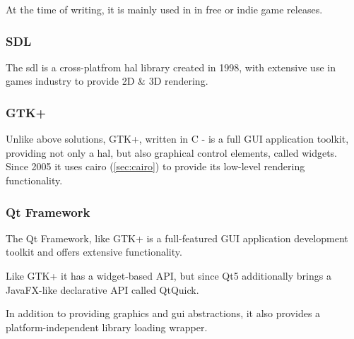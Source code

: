 At the time of writing, it is mainly used in in free or indie game releases.

\subsubsection{SDL}
The \gls{sdl} is a cross-platfrom \gls{hal} library created in 1998, with extensive use in games industry to provide 2D \& 3D rendering.

\subsubsection{GTK+}
Unlike above solutions, GTK+, written in C - is a full GUI application toolkit, providing not only a \gls{hal}, but also graphical control elements, called widgets. Since 2005 it uses cairo (\ref{sec:cairo}) to provide its low-level rendering functionality.

\subsubsection{Qt Framework}
The Qt Framework, like GTK+ is a full-featured GUI application development toolkit and offers extensive functionality.

Like GTK+ it has a widget-based API, but since Qt5 additionally brings a JavaFX-like declarative API called QtQuick.

In addition to providing graphics and \gls{gui} abstractions, it also provides a platform-independent library loading wrapper.

